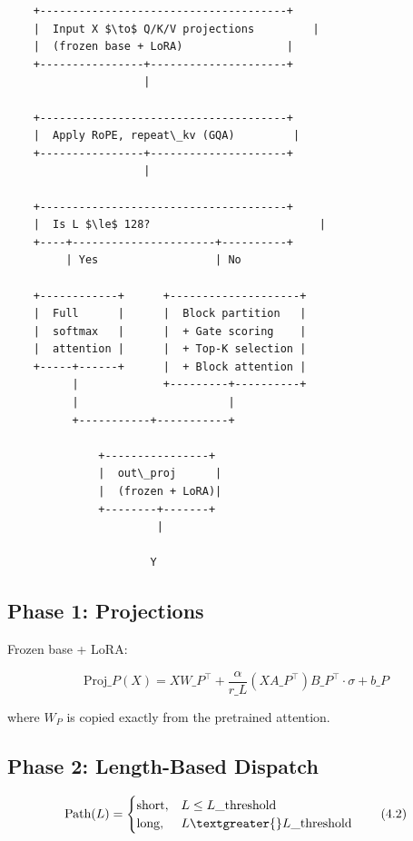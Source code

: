 \begin{lstlisting}
    +--------------------------------------+
    |  Input X $\to$ Q/K/V projections         |
    |  (frozen base + LoRA)                |
    +----------------+---------------------+
                     |
                      
    +--------------------------------------+
    |  Apply RoPE, repeat\_kv (GQA)         |
    +----------------+---------------------+
                     |
                      
    +--------------------------------------+
    |  Is L $\le$ 128?                          |
    +----+----------------------+----------+
         | Yes                  | No
                                 
    +------------+      +--------------------+
    |  Full      |      |  Block partition   |
    |  softmax   |      |  + Gate scoring    |
    |  attention |      |  + Top-K selection |
    +-----+------+      |  + Block attention |
          |             +---------+----------+
          |                       |
          +-----------+-----------+
                       
              +----------------+
              |  out\_proj      |
              |  (frozen + LoRA)|
              +--------+-------+
                       |
                        
                      Y
\end{lstlisting}

\subsection{Phase 1: Projections}

Frozen base + LoRA:

\[
\text{Proj}\_P(X) = X W\_P^\top + \frac{\alpha}{r\_L} (X A\_P^\top) B\_P^\top \cdot \sigma + b\_P
\tag{4.1}
\]

where $W_P$ is copied exactly from the pretrained attention.

\subsection{Phase 2: Length-Based Dispatch}

\[
\text{Path}(L) = \begin{cases}
\text{short}, & L \leq L\_\text{threshold} \\
\text{long}, & L \textgreater{} L\_\text{threshold}
\end{cases}
\tag{4.2}
\]

